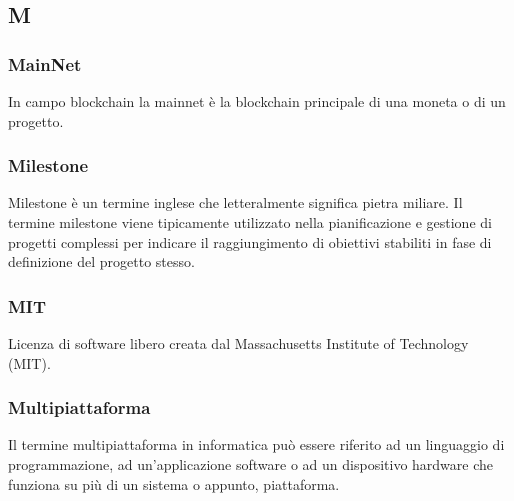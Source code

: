 \subsection*{\textbf{\hfill \Huge{M} \hfill}} 
\subsubsection*{MainNet}
In campo blockchain la mainnet è la blockchain principale di una moneta o di un progetto.
\subsubsection*{Milestone}
Milestone è un termine inglese che letteralmente significa pietra miliare. Il termine milestone viene tipicamente utilizzato nella pianificazione e gestione di progetti complessi per indicare il raggiungimento di obiettivi stabiliti in fase di definizione del progetto stesso.
\subsubsection*{MIT}
Licenza di software libero creata dal Massachusetts Institute of Technology (MIT).
\subsubsection*{Multipiattaforma}
Il termine multipiattaforma in informatica può essere riferito ad un linguaggio di programmazione, ad un'applicazione software o ad un dispositivo hardware che funziona su più di un sistema o appunto, piattaforma.
